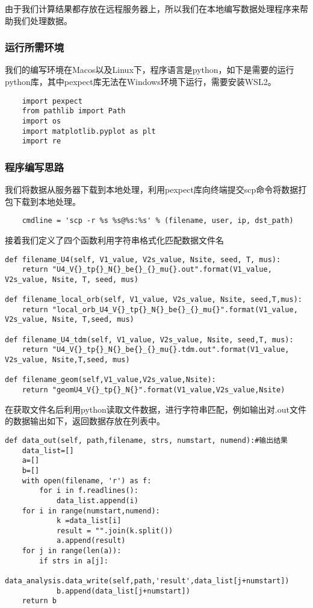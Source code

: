 由于我们计算结果都存放在远程服务器上，所以我们在本地编写数据处理程序来帮助我们处理数据。
\subsubsection{运行所需环境}
我们的编写环境在Macos以及Linux下，程序语言是python，如下是需要的运行python库，其中pexpect库无法在Windows环境下运行，需要安装WSL2。
\begin{lstlisting}
    import pexpect
    from pathlib import Path
    import os
    import matplotlib.pyplot as plt
    import re
\end{lstlisting}

\subsubsection{程序编写思路}
我们将数据从服务器下载到本地处理，利用pexpect库向终端提交scp命令将数据打包下载到本地处理。
\begin{lstlisting}
    cmdline = 'scp -r %s %s@%s:%s' % (filename, user, ip, dst_path)
\end{lstlisting}
接着我们定义了四个函数利用字符串格式化匹配数据文件名
\begin{lstlisting}
def filename_U4(self, V1_value, V2s_value, Nsite, seed, T, mus):
    return "U4_V{}_tp{}_N{}_be{}_{}_mu{}.out".format(V1_value, V2s_value, Nsite, T, seed, mus)

def filename_local_orb(self, V1_value, V2s_value, Nsite, seed,T,mus):
    return "local_orb_U4_V{}_tp{}_N{}_be{}_{}_mu{}".format(V1_value, V2s_value, Nsite, T,seed, mus)

def filename_U4_tdm(self, V1_value, V2s_value, Nsite, seed,T, mus):
    return "U4_V{}_tp{}_N{}_be{}_{}_mu{}.tdm.out".format(V1_value, V2s_value, Nsite,T,seed, mus)

def filename_geom(self,V1_value,V2s_value,Nsite):
    return "geomU4_V{}_tp{}_N{}".format(V1_value,V2s_value,Nsite)
\end{lstlisting}
在获取文件名后利用python读取文件数据，进行字符串匹配，例如输出对.out文件的数据输出如下，返回数据存放在列表中。
\begin{lstlisting}
def data_out(self, path,filename, strs, numstart, numend):#输出结果
    data_list=[]
    a=[]
    b=[]
    with open(filename, 'r') as f:
        for i in f.readlines():
            data_list.append(i)
    for i in range(numstart,numend):
            k =data_list[i]
            result = "".join(k.split())
            a.append(result)
    for j in range(len(a)):
        if strs in a[j]:
            data_analysis.data_write(self,path,'result',data_list[j+numstart])
            b.append(data_list[j+numstart])
    return b
\end{lstlisting}
